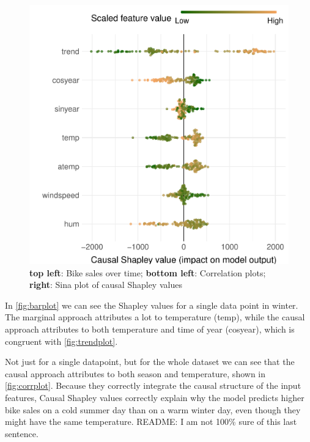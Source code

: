 \documentclass{article}
\begin{document}
\begin{figure}[h!]
\begin{minipage}{.5\linewidth}
		\includegraphics[width=\textwidth]{figures/sina_plot.pdf}
	\end{minipage}
	\label{fig:trendplot}
	\caption{\textbf{top left}: Bike sales over time; \textbf{bottom left}: Correlation plots; \textbf{right}: Sina plot of causal Shapley values}
\end{figure}


In \autoref{fig:barplot} we can see the Shapley values for a single data point in winter.
The marginal approach attributes a lot to temperature (temp), while the causal approach attributes to both temperature and time of year (cosyear), which is congruent with \autoref{fig:trendplot}.

Not just for a single datapoint, but for the whole dataset we can see that the causal approach attributes to both season and temperature, shown in \autoref{fig:corrplot}.
Because they correctly integrate the causal structure of the input features, Causal Shapley values correctly explain why the model predicts higher bike sales on a cold summer day than on a warm winter day, even though they might have the same temperature.
README: I am not 100\% sure of this last sentence.
\end{document}
